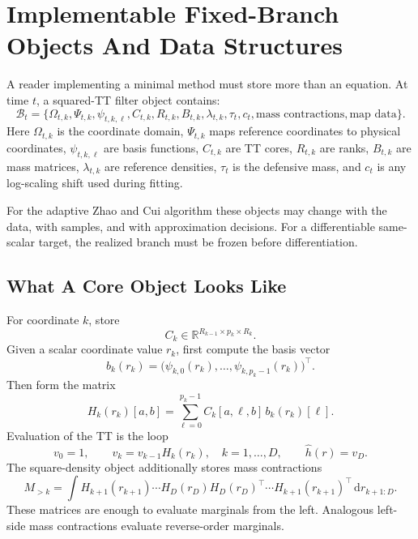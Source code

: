\documentclass[11pt]{article}
\numberwithin{equation}{section}
\newcommand{\R}{\mathbb R}
\newcommand{\dd}{\,\mathrm d}
\begin{document}
\section{Implementable Fixed-Branch Objects And Data Structures}

A reader implementing a minimal method must store more than an equation.  At
time \(t\), a squared-TT filter object contains:
\[
    \mathcal B_t
    =
    \{
    \Omega_{t,k},\Psi_{t,k},\psi_{t,k,\ell},C_{t,k},
    R_{t,k},B_{t,k},\lambda_{t,k},\tau_t,c_t,
    \text{mass contractions},\text{map data}
    \}.
\]
Here \(\Omega_{t,k}\) is the coordinate domain, \(\Psi_{t,k}\) maps reference
coordinates to physical coordinates, \(\psi_{t,k,\ell}\) are basis functions,
\(C_{t,k}\) are TT cores, \(R_{t,k}\) are ranks, \(B_{t,k}\) are mass matrices,
\(\lambda_{t,k}\) are reference densities, \(\tau_t\) is the defensive mass, and
\(c_t\) is any log-scaling shift used during fitting.

For the adaptive Zhao and Cui \cite{zhao2024ttsequential} algorithm these objects may change with the data,
with samples, and with approximation decisions.  For a differentiable
same-scalar target, the realized branch must be frozen before differentiation.

\subsection{What A Core Object Looks Like}

For coordinate \(k\), store
\[
    C_k\in\R^{R_{k-1}\times p_k\times R_k}.
\]
Given a scalar coordinate value \(r_k\), first compute the basis vector
\[
    b_k(r_k)=
    \bigl(\psi_{k,0}(r_k),\ldots,\psi_{k,p_k-1}(r_k)\bigr)^\top.
\]
Then form the matrix
\begin{equation}
    H_k(r_k)[a,b]
    =
    \sum_{\ell=0}^{p_k-1}C_k[a,\ell,b]\,b_k(r_k)[\ell].
    \label{eq:p24-d1}
\end{equation}
Evaluation of the TT is the loop
\begin{equation}
    v_0=1,\qquad
    v_k=v_{k-1}H_k(r_k),\quad k=1,\ldots,D,
    \qquad
    \widehat h(r)=v_D.
    \label{eq:p24-d2}
\end{equation}
The square-density object additionally stores mass contractions
\begin{equation}
    M_{>k}
    =
    \int H_{k+1}(r_{k+1})\cdots H_D(r_D)
    H_D(r_D)^\top\cdots H_{k+1}(r_{k+1})^\top
    \dd r_{k+1:D}.
    \label{eq:p24-d3}
\end{equation}
These matrices are enough to evaluate marginals from the left.  Analogous
left-side mass contractions evaluate reverse-order marginals.
\end{document}
